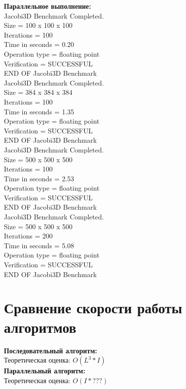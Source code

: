 \documentclass[a4paper,12pt,titlepage,draft]{article}
\begin{document}
\begin{minipage}{.45\textwidth}
\textbf{Параллельное выполнение:}\\

 Jacobi3D Benchmark Completed.\\
 Size            =  100 x  100 x  100\\
 Iterations      =                100\\
 Time in seconds =               0.20\\
 Operation type  =     floating point\\
 Verification    =         SUCCESSFUL\\
 END OF Jacobi3D Benchmark\\

Jacobi3D Benchmark Completed.\\
 Size            =  384 x  384 x  384\\
 Iterations      =                100\\
 Time in seconds =               1.35\\
 Operation type  =     floating point\\
 Verification    =         SUCCESSFUL\\
 END OF Jacobi3D Benchmark\\

 Jacobi3D Benchmark Completed.\\
 Size            =  500 x  500 x  500\\
 Iterations      =                100\\
 Time in seconds =               2.53\\
 Operation type  =     floating point\\
 Verification    =         SUCCESSFUL\\
 END OF Jacobi3D Benchmark\\

 Jacobi3D Benchmark Completed.\\
 Size            =  500 x  500 x  500\\
 Iterations      =                200\\
 Time in seconds =               5.08\\
 Operation type  =     floating point\\
 Verification    =         SUCCESSFUL\\
 END OF Jacobi3D Benchmark\\

\end{minipage}
\newpage
\section{Сравнение скорости работы алгоритмов}
\textbf{Последовательный алгоритм:}\\

Теоретическая оценка: $O(L^3 * I)$\\

\textbf{Параллельный алгоритм:}\\

Теоретическая оценка: $O(I * ???)$
\end{document}
